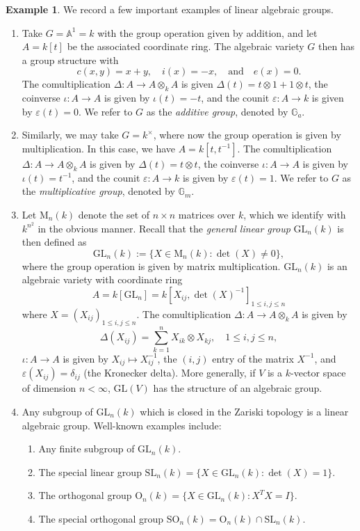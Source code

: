 \documentclass[10pt]{amsart}
\numberwithin{equation}{section}
\newcommand{\ve}{\varepsilon}
\newcommand{\G}{\mathbb{G}}
\newcommand{\A}{\mathbb{A}}
\newcommand{\M}{\mathrm{M}}
\newcommand{\SL}{\mathrm{SL}}
\newcommand{\SO}{\mathrm{SO}}
\renewcommand{\O}{\mathrm{O}}
\newcommand{\GL}{\mathrm{GL}}
\theoremstyle{plain}
\theoremstyle{definition}
\newtheorem{ex}[thm]{Example}
\theoremstyle{remark}
\begin{document}
\begin{ex}We record a few important examples of linear algebraic groups.
 \begin{enumerate}
\item Take $G = \A^1 = k$ with the group operation given by addition, and let $A = k[t]$ be the associated coordinate ring. The algebraic variety $G$ then has a group structure with 
\[c(x, y) = x + y, \quad i(x) = -x, \quad \text{and} \quad e(x) = 0.\]
The comultiplication $\Delta: A \to A \otimes_k A$ is given $\Delta(t) = t \otimes 1 + 1 \otimes t$, the coinverse $\iota: A \to A$ is given by $\iota(t) = -t$, and the counit $\ve: A \to k$ is given by $\ve(t) = 0$. We refer to $G$ as the \emph{additive group}, denoted by $\G_a$.
\item Similarly, we may take $G = k^\times$, where now the group operation is given by multiplication. In this case, we have $A = k[t, t^{-1}]$. The comultiplication $\Delta: A \to A \otimes_k A$ is given by $\Delta(t) = t \otimes t$, the coinverse $\iota: A \to A$ is given by $\iota(t) = t^{-1}$, and the counit $\ve: A \to k$ is given by $\ve(t) = 1$. We refer to $G$ as the \emph{multiplicative group}, denoted by $\G_m$.
\item         Let $\M_n(k)$ denote the set of $n \times n$ matrices over $k$, which we identify with $k^{n^2}$ in the obvious manner. Recall that the \emph{general linear group} $\GL_n(k)$ is then defined as
\[\GL_n(k) := \{X \in \M_n(k) : \det(X) \ne 0\},\]
where the group operation is given by matrix multiplication. $\GL_n(k)$ is an algebraic variety with coordinate ring 
\[A = k[\GL_n] = k[X_{ij}, \det(X)^{-1}]_{1 \le i, j \le n}\]
where $X = (X_{ij})_{1 \le i, j \le n}$. The comultiplication $\Delta: A \to A \otimes_k A$ is given by 
\[\Delta(X_{ij}) = \sum_{k =1}^n X_{ik} \otimes X_{kj}, \quad 1 \le i, j \le n,\]
$\iota: A \to A$ is given by $X_{ij} \mapsto X_{ij}^{-1}$, the $(i,j)$ entry of the matrix $X^{-1}$, and $\ve(X_{ij}) = \delta_{ij}$ (the Kronecker delta). More generally, if $V$ is a $k$-vector space of dimension $n < \infty$, $\GL(V)$ has the structure of an algebraic group.   
\item     Any subgroup of $\GL_n(k)$ which is closed in the Zariski topology is a linear algebraic group. Well-known examples include:
    \begin{enumerate}
        \item Any finite subgroup of $\GL_n(k)$.
        \item The special linear group $\SL_n(k) = \{X \in \GL_n(k) : \det(X) = 1\}$.
        \item The orthogonal group $\O_n(k) = \{X \in \GL_n(k) : X^T X = I\}$.
        \item The special orthogonal group $\SO_n(k) = \O_n(k) \cap \SL_n(k)$.
    \end{enumerate} 
\end{enumerate}
\end{ex}
\end{document}
